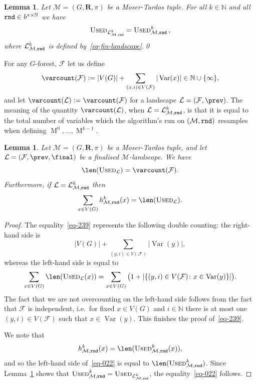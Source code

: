 \documentclass[12pt,a4paper]{article}
\numberwithin{equation}{section}
\newtheorem{lemma}[equation]{Lemma}
\theoremstyle{definition}
\newcommand\NN{\mathbb N}
\renewcommand{\cal}[1]{{\mathcal #1}}
\newcommand\MT{\operatorname{M}}
\newcommand\Var{\operatorname{Var}}
\newcommand{\used}{\textsc{Used}}
\begin{document}
    \begin{lemma}\label{lem-equal-used}
    Let $\cal M =(G, \mathbf R,  \pi)$ be a Moser-Tardos tuple. For all $k\in \NN$ and all $\rnd\in b^{\pi\times \NN}$ we have 
    $$
        \used_{\cal L^k_{\cal M,\rnd}} = \used_{\cal M,\rnd}^k \, ,
    $$
    where $\cal L^k_{\cal M,\rnd}$ is defined by~\eqref{eq-fin-landscape}.\qed
    \end{lemma}
    
    For any $G$-forest, $\cal F$ let us define 
    $$
        \varcount(\cal F) :=  |V(G)|+ \sum_{(x,i)\in V(\cal F)} |\Var(x)| \in \NN\cup \{\infty\},
    $$
    and let $\varcount(\cal L):=\varcount(\cal F)$ for a landscape $\cal L=(\cal F,\prev)$. The meaning of the quantity $\varcount(\cal L)$, when $\cal L=\cal L^k_{\cal M,\rnd}$, is that it is equal to the total number of variables which the algorithm's run on $(\cal M,\rnd)$ resamples when defining $\MT^0,\ldots, \MT^{k-1}$. 
    
    \begin{lemma}\label{lem-varcount}
    Let $\cal M=(G,\mathbf R, \pi)$ be a Moser-Tardos tuple, and let $\cal L=(\cal F, \prev,\final)$ be a finalised $\cal M$-landscape. We have
    \begin{equation}\label{eq-239}
           \len(\used_{\cal L}) = \varcount(\cal F).
    \end{equation}
    Furthermore, if $\cal L=\cal L^k_{\cal M,\rnd}$ then
    \begin{equation}\label{eq-022}
     \sum_{x\in V(G)} h^k_{\cal M, \rnd} (x)= \len(\used_{\cal L}).
    \end{equation}
    \end{lemma}
    \begin{proof}
    The equality~\eqref{eq-239} represents the following double counting: the right-hand side  is
    $$
    |V(G)| + \sum_{(y,i)\in V(\cal F)} |\Var(y)|,
    $$
    whereas the left-hand side is equal to
    $$
    \sum_{x\in V(G)} \len(\used_{\cal L}(x))= \sum_{x\in V(G)} \big(1+ |\{(y,i)\in V(\cal F)\colon x\in \Var(y)\}|\big).
    $$
    The fact that we are not overcounting on the left-hand side follows from the fact that $\cal F$ is independent, i.e.~for fixed  $x\in V(G)$ and $i\in\NN$ there is at most one $(y,i)\in V(\cal F)$ such that $x\in \Var(y)$. This finishes the proof of~\eqref{eq-239}.
    
    We note that 
    $$
     h^k_{\cal M, \rnd} (x) = \len(\used^k_{\cal M,\rnd}(x)),
    $$
    and so the left-hand side of~\eqref{eq-022} is equal to $\len(\used^k_{\cal M,\rnd})$. Since Lemma~\ref{lem-equal-used} shows that  $\used_{\cal M,\rnd}^k = \used_{\cal L^k_{\cal M,\rnd}}$, the equality~\eqref{eq-022} follows.
    \end{proof}
    
\end{document}
